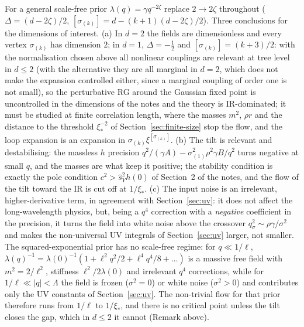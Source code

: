\documentclass[11pt,a4paper]{article}
\newcommand{\Lam}{\Lambda}
\newcommand{\sY}{\hat s_Y}
\begin{document}
For a general scale-free prior $\lambda(q) = \gamma q^{-2\zeta}$ replace $2\to2\zeta$ throughout ($\Delta = (d-2\zeta)/2$, $[\sigma_{(k)}] = d-(k+1)(d-2\zeta)/2$). Three conclusions for the dimensions of interest. (a) In $d=2$ the fields are dimensionless and every vertex $\sigma_{(k)}$ has dimension $2$; in $d=1$, $\Delta = -\frac12$ and $[\sigma_{(k)}] = (k+3)/2$: with the normalisation chosen above all nonlinear couplings are relevant at tree level in $d\le2$ (with the alternative they are all marginal in $d=2$, which does not make the expansion controlled either, since a marginal coupling of order one is not small), so the perturbative RG around the Gaussian fixed point is uncontrolled in the dimensions of the notes and the theory is IR-dominated; it must be studied at finite correlation length, where the masses $m^2$, $\rho r$ and the distance to the threshold $\xi_*^{-2}$ of Section~\ref{sec:finite-size} stop the flow, and the loop expansion is an expansion in $\sigma_{(k)}\xi^{[\sigma_{(k)}]}$. (b) The tilt is relevant and destabilising: the massless $h$ precision $q^2/(\gamma A) - \sigma_{(1)}^2\rho^2\gamma B/q^2$ turns negative at small $q$, and the masses are what keep it positive; the stability condition is exactly the pole condition $c^2>\sY^2h(0)$ of Section~2 of the notes, and the flow of the tilt toward the IR is cut off at $1/\xi_*$. (c) The input noise is an irrelevant, higher-derivative term, in agreement with Section~\ref{sec:uv}: it does not affect the long-wavelength physics, but, being a $q^4$ correction with a \emph{negative} coefficient in the precision, it turns the field into white noise above the crossover $q_\sigma^2\sim\rho\gamma/\sigma^2$ and makes the non-universal UV integrals of Section~\ref{sec:uv} larger, not smaller. The squared-exponential prior has no scale-free regime: for $q\ll1/\ell$, $\lambda(q)^{-1} = \lambda(0)^{-1}(1+\ell^2q^2/2+\ell^4q^4/8+\dots)$ is a massive free field with $m^2 = 2/\ell^2$, stiffness $\ell^2/2\lambda(0)$ and irrelevant $q^4$ corrections, while for $1/\ell\ll|q|<\Lam$ the field is frozen ($\sigma^2 = 0$) or white noise ($\sigma^2>0$) and contributes only the UV constants of Section~\ref{sec:uv}. The non-trivial flow for that prior therefore runs from $1/\ell$ to $1/\xi_*$, and there is no critical point unless the tilt closes the gap, which in $d\le2$ it cannot (Remark above).
\end{document}
